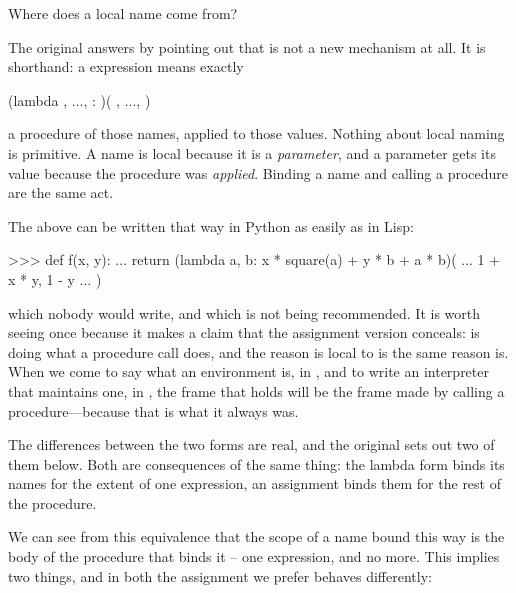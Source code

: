 \begin{buildFromScarcity}
Where does a local name come from?

The original answers by pointing out that  is not a new mechanism at
all.  It is shorthand: a  expression means exactly

\begin{syntaxForm}
(lambda , ..., : )(
    , ..., )
\end{syntaxForm}

\noindent
a procedure of those names, applied to those values.  Nothing about local
naming is primitive.  A name is local because it is a \emph{parameter}, and a
parameter gets its value because the procedure was \emph{applied}.  Binding a
name and calling a procedure are the same act.

The  above can be written that way in Python as easily as in Lisp:

\begin{codeBlock}
>>> def f(x, y):
...     return (lambda a, b: x * square(a) + y * b + a * b)(
...         1 + x * y, 1 - y
...     )
\end{codeBlock}

\noindent
which nobody would write, and which is not being recommended.  It is worth
seeing once because it makes a claim that the assignment version conceals:
 is doing what a procedure call does, and the reason
 is local to  is the same reason  is.  When we come to
say what an environment is, in , and to write an interpreter
that maintains one, in , the frame that holds  will be
the frame made by calling a procedure---because that is what it always was.

The differences between the two forms are real, and the original sets out two
of them below.  Both are consequences of the same thing: the lambda form binds
its names for the extent of one expression, an assignment binds them for the
rest of the procedure.
\end{buildFromScarcity}

We can see from this equivalence that the scope of a name bound this way is
the body of the procedure that binds it -- one expression, and no more. This
implies two things, and in both the assignment we prefer behaves differently:

